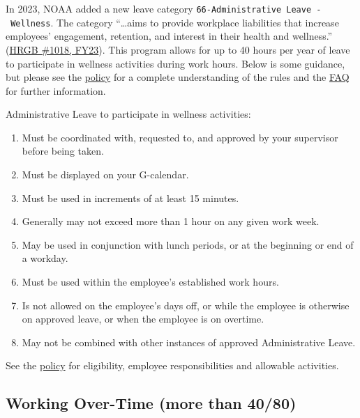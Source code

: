 \documentclass[
  letterpaper,
  DIV=11,
  numbers=noendperiod]{scrreprt}
\providecommand{\tightlist}{%
  \setlength{\itemsep}{0pt}\setlength{\parskip}{0pt}}\usepackage{longtable,booktabs,array}
\begin{document}
In 2023, NOAA added a new leave category
\texttt{66-Administrative\ Leave\ -\ Wellness}. The category
``\ldots aims to provide workplace liabilities that increase employees'
engagement, retention, and interest in their health and wellness.''
(\href{https://drive.google.com/file/d/1Z5XUCydpDjW-j8YLKRshp0WT_ZEfKKcq/view?pli=1}{HRGB
\#1018, FY23}). This program allows for up to 40 hours per year of leave
to participate in wellness activities during work hours. Below is some
guidance, but please see the
\href{https://drive.google.com/file/d/1Z5XUCydpDjW-j8YLKRshp0WT_ZEfKKcq/view?pli=1}{policy}
for a complete understanding of the rules and the
\href{https://drive.google.com/file/d/1asc745qKgQXn_7Tlp_DxnJhOYuYlROfX/view}{FAQ}
for further information.

Administrative Leave to participate in wellness activities:

\begin{enumerate}
\def\labelenumi{\arabic{enumi}.}
\tightlist
\item
  Must be coordinated with, requested to, and approved by your
  supervisor before being taken.\\
\item
  Must be displayed on your G-calendar.\\
\item
  Must be used in increments of at least 15 minutes.\\
\item
  Generally may not exceed more than 1 hour on any given work week.\\
\item
  May be used in conjunction with lunch periods, or at the beginning or
  end of a workday.\\
\item
  Must be used within the employee's established work hours.\\
\item
  Is not allowed on the employee's days off, or while the employee is
  otherwise on approved leave, or when the employee is on overtime.\\
\item
  May not be combined with other instances of approved Administrative
  Leave.
\end{enumerate}

See the
\href{https://drive.google.com/file/d/1Z5XUCydpDjW-j8YLKRshp0WT_ZEfKKcq/view?pli=1}{policy}
for eligibility, employee responsibilities and allowable activities.

\subsection{Working Over-Time (more than
40/80)}\label{working-over-time-more-than-4080}
\end{document}
